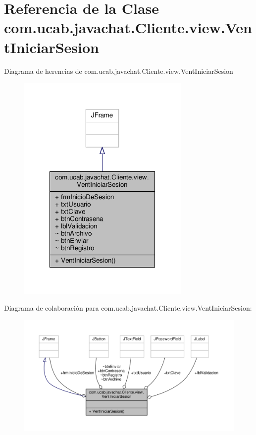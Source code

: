 \hypertarget{classcom_1_1ucab_1_1javachat_1_1_cliente_1_1view_1_1_vent_iniciar_sesion}{\section{Referencia de la Clase com.\-ucab.\-javachat.\-Cliente.\-view.\-Vent\-Iniciar\-Sesion}
\label{classcom_1_1ucab_1_1javachat_1_1_cliente_1_1view_1_1_vent_iniciar_sesion}
}


Diagrama de herencias de com.\-ucab.\-javachat.\-Cliente.\-view.\-Vent\-Iniciar\-Sesion
\nopagebreak
\begin{figure}[H]
\begin{center}
\leavevmode
\includegraphics[width=238pt]{d9/d8b/classcom_1_1ucab_1_1javachat_1_1_cliente_1_1view_1_1_vent_iniciar_sesion__inherit__graph}
\end{center}
\end{figure}


Diagrama de colaboración para com.\-ucab.\-javachat.\-Cliente.\-view.\-Vent\-Iniciar\-Sesion\-:
\nopagebreak
\begin{figure}[H]
\begin{center}
\leavevmode
\includegraphics[width=350pt]{df/dde/classcom_1_1ucab_1_1javachat_1_1_cliente_1_1view_1_1_vent_iniciar_sesion__coll__graph}
\end{center}
\end{figure}
